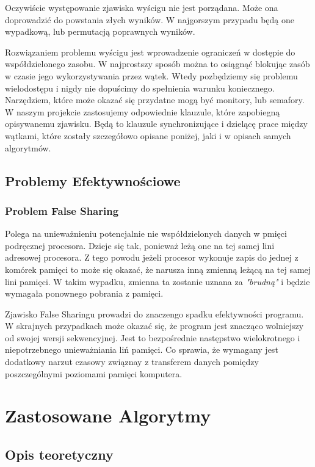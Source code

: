 \documentclass{article}
\begin{document}
                Oczywiście występowanie zjawiska wyścigu nie jest porządana. Może ona doprowadzić do powstania złych wyników. W najgorszym przypadu będą one wypadkową, lub permutacją poprawnych wyników. 
                
                Rozwiązaniem problemu wyścigu jest wprowadzenie ograniczeń w dostępie do współdzielonego zasobu. W najprostszy sposób można to osiągnąć blokując zasób w czasie jego wykorzystywania przez wątek. Wtedy pozbędziemy się problemu wielodostępu i nigdy nie dopuścimy do spełnienia warunku koniecznego. Narzędziem, które może okazać się przydatne mogą być monitory, lub semafory. W naszym projekcie zastosujemy odpowiednie klauzule, które zapobiegną opisywanemu zjawisku. Będą to klauzule synchronizujące i dzielącę prace między wątkami, które zostały szczegółowo opisane poniżej, jaki i w opisach samych algorytmów.
        
        \subsection{Problemy Efektywnościowe}
            \subsubsection{Problem False Sharing}
                Polega na unieważnieniu potencjalnie nie współdzielonych danych w pmięci podręcznej procesora. Dzieje się tak, ponieważ leżą one na tej samej lini adresowej procesora. Z tego powodu jeżeli procesor wykonuje zapis do jednej z komórek pamięci to może się okazać, że narusza inną zmienną leżącą na tej samej lini pamięci. W takim wypadku, zmienna ta zostanie uznana za \emph{"brudną"} i będzie wymagała ponownego pobrania z pamięci.
                
                Zjawisko False Sharingu prowadzi do znaczengo spadku efektywności programu. W skrajnych przypadkach może okazać się, że program jest znacząco wolniejszy od swojej wersji sekwencyjnej. Jest to bezpośrednie następstwo wielokrotnego i niepotrzebnego unieważniania liń pamięci. Co sprawia, że wymagany jest dodatkowy narzut czasowy związnay z transferem danych pomiędzy poszczególnymi poziomami pamięci komputera.
                
                
        
    \section{Zastosowane Algorytmy}
        \subsection{Opis teoretyczny}
\end{document}
